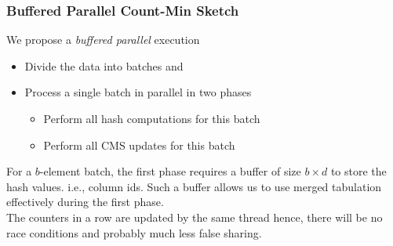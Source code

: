 \documentclass{beamer}
\begin{document}
\begin{frame}
\frametitle{Buffered Parallel Count-Min Sketch}
We propose a \textit{buffered parallel} execution%
\begin{itemize}
	\item Divide the data into batches and
	\item Process a single batch in parallel in two phases
		\begin{itemize}
		\item{Perform all hash computations for this batch}
		\item{Perform all CMS updates for this batch}
		\end{itemize}
\end{itemize}
\vspace*{1ex}
For a $b$-element batch, the first phase requires a buffer of size $b \times d$ to store the hash values. i.e., column ids. 
Such a buffer allows us to use merged tabulation effectively during the first phase. 
\\
\vspace*{2ex}
The counters in a row are updated by the same
thread hence, there will be no race conditions and probably much less false sharing.
\end{frame}
\end{document}
